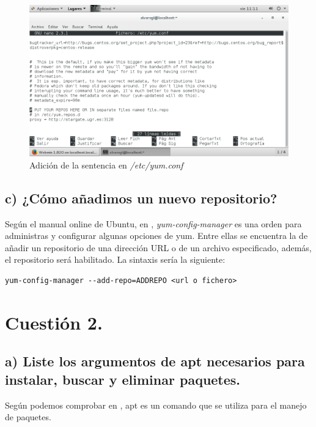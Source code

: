 \begin{figure}[H]
	\centering
	\includegraphics[scale=0.6]{ise2.png}
	\caption{Adición de la sentencia  en \textit{/etc/yum.conf}} \label{ise2}
\end{figure}

\subsection{c) ¿Cómo añadimos un nuevo repositorio?}

Según el manual online de Ubuntu, en \cite{yum-config}, \textit{yum-config-manager} es una orden para administras y configurar algunas opciones de yum. Entre ellas se encuentra la de añadir un repositorio de una dirección URL o de un archivo especificado, además, el repositorio será habilitado.
La sintaxis sería la siguiente:

\begin{verbatim}
yum-config-manager --add-repo=ADDREPO <url o fichero>
\end{verbatim}
\newpage

\section{Cuestión 2.}

\subsection{a) Liste los argumentos de apt necesarios para instalar, buscar y eliminar paquetes.}

Según podemos comprobar en \cite{apt}, apt es un comando que se utiliza para el manejo de paquetes.

